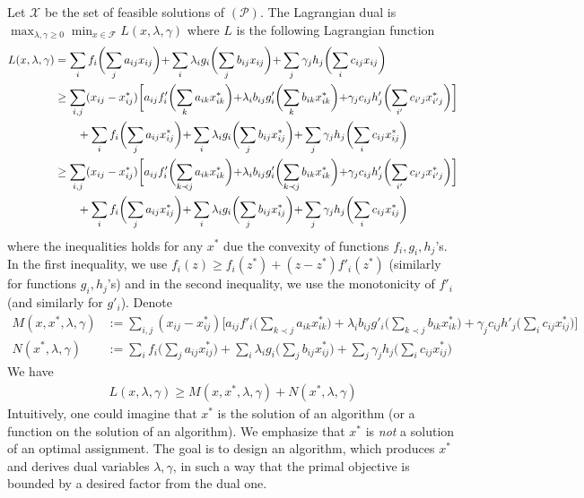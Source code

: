 \documentclass[11pt]{article}
\begin{document}
Let $\mathcal{X}$ be the set of feasible solutions of $(\mathcal{P})$. 
The Lagrangian dual is
$
\max_{\lambda,\gamma \geq 0} \min_{x \in \mathcal{F}} L(x,\lambda,\gamma)
$ 
where $L$ is the following Lagrangian function 
\begin{align*}
L(x,\lambda,\gamma) &= \sum_{i} f_{i}\biggl( \sum_{j} a_{ij}x_{ij} \biggl) 
+ \sum_{i} \lambda_{i} g_{i}\biggl(\sum_{j} b_{ij} x_{ij}\biggl)
+ \sum_{j} \gamma_{j} h_{j}\biggl(\sum_{i} c_{ij} x_{ij}\biggl) \notag \\
&\geq \sum_{i,j} (x_{ij} - x^{*}_{ij})\biggl[ a_{ij}f'_{i}\biggl( \sum_{k} a_{ik}x^{*}_{ik} \biggl) 
	+ \lambda_{i} b_{ij}g'_{i}\biggl(\sum_{k} b_{ik} x^{*}_{ik}\biggl)  
	+ \gamma_{j}c_{ij} h'_{j}\biggl(\sum_{i'} c_{i'j} x^{*}_{i'j}\biggl) \biggl] \notag \\
& \qquad +  \sum_{i} f_{i}\biggl( \sum_{j} a_{ij}x^{*}_{ij} \biggl)
	+ \sum_{i} \lambda_{i} g_{i}\biggl(\sum_{j} b_{ij} x^{*}_{ij}\biggl)
	+ \sum_{j} \gamma_{j} h_{j}\biggl(\sum_{i} c_{ij} x^{*}_{ij}\biggl)  \\
&\geq \sum_{i,j} (x_{ij} - x^{*}_{ij})\biggl[ a_{ij}f'_{i}\biggl( \sum_{k \prec j} a_{ik}x^{*}_{ik} \biggl) 
	+ \lambda_{i} b_{ij}g'_{i}\biggl(\sum_{k \prec j} b_{ik} x^{*}_{ik}\biggl)  
	+ \gamma_{j}c_{ij} h'_{j}\biggl(\sum_{i'} c_{i'j} x^{*}_{i'j}\biggl) \biggl] \notag \\
& \qquad +  \sum_{i} f_{i}\biggl( \sum_{j} a_{ij}x^{*}_{ij} \biggl)
	+ \sum_{i} \lambda_{i} g_{i}\biggl(\sum_{j} b_{ij} x^{*}_{ij}\biggl)
	+ \sum_{j} \gamma_{j} h_{j}\biggl(\sum_{i} c_{ij} x^{*}_{ij}\biggl)  
\end{align*}
where the inequalities holds for any $x^{*}$ due the convexity of functions $f_{i},g_{i},h_{j}$'s.
In the first inequality, we use $f_{i}(z) \geq f_{i}(z^{*}) + (z-z^{*})f'_{i}(z^{*})$ 
(similarly for functions $g_{i},h_{j}$'s) and in the second inequality, 
we use the monotonicity of $f'_{i}$ (and similarly for $g'_{i}$).
Denote 
\begin{align*}
 M(x,x^{*},\lambda,\gamma) &:= \sum_{i,j} (x_{ij} - x^{*}_{ij}) \biggl[ a_{ij}f'_{i}\biggl( \sum_{k \prec j} a_{ik}x^{*}_{ik} \biggl) 
	+ \lambda_{i} b_{ij}g'_{i}\biggl(\sum_{k \prec j} b_{ik} x^{*}_{ik}\biggl)  
	+ \gamma_{j}c_{ij} h'_{j}\biggl(\sum_{i} c_{ij} x^{*}_{ij}\biggl) \biggl] \\
N(x^{*},\lambda, \gamma) &:= \sum_{i} f_{i}\biggl( \sum_{j} a_{ij}x^{*}_{ij} \biggl)
	+ \sum_{i} \lambda_{i} g_{i}\biggl(\sum_{j} b_{ij} x^{*}_{ij}\biggl)
	+ \sum_{j} \gamma_{j} h_{j}\biggl(\sum_{i} c_{ij} x^{*}_{ij}\biggl)  
\end{align*}
We have 
\begin{align} 	\label{framework-Lagrangian}
L(x,\lambda,\gamma) \geq M(x,x^{*},\lambda,\gamma) + N(x^{*},\lambda,\gamma)
\end{align}
Intuitively, one could imagine that $x^{*}$ is the solution of an algorithm (or a function 
on the solution of an algorithm). We emphasize that $x^{*}$ is \emph{not} a solution of 
an optimal assignment. The goal is to design 
an algorithm, which produces $x^{*}$ and derives dual variables $\lambda, \gamma$, in such
a way that the primal objective is bounded by a desired factor from the dual one.
   
\end{document}
